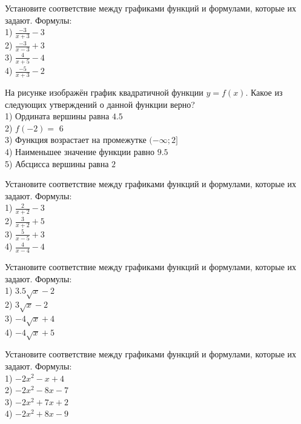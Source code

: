 \documentclass[4apaper]{article}
\begin{document}
\begin{taskBN}{33}
Установите соответствие между графиками функций и формулами, которые их задают. Формулы: \\1) $\frac{-3}{x+3}-3$\\2) $\frac{-3}{x-3}+3$\\3) $\frac{4}{x+5}-4$\\4) $\frac{-5}{x+3}-2$
\end{taskBN}

\begin{taskBN}{34}
На рисунке изображён график квадратичной функции $y=f(x)$. Какое из следующих утверждений о данной функции верно?\\1) Ордината вершины равна $4.5$\\2) $f(-2)=$ $6$\\3) Функция возрастает на промежутке $(-\infty;2]$\\4) Наименьшее значение функции равно  $9.5$\\5) Абсцисса вершины равна $2$
\end{taskBN}

\begin{taskBN}{35}
Установите соответствие между графиками функций и формулами, которые их задают. Формулы: \\1) $\frac{2}{x+2}-3$\\2) $\frac{3}{x+2}+5$\\3) $\frac{5}{x-5}+3$\\4) $\frac{4}{x-4}-4$
\end{taskBN}

\begin{taskBN}{36}
Установите соответствие между графиками функций и формулами, которые их задают. Формулы: \\1) $3.5\sqrt{x}-2$\\2) $3\sqrt{x}-2$\\3) $-4\sqrt{x}+4$\\4) $-4\sqrt{x}+5$
\end{taskBN}

\begin{taskBN}{37}
Установите соответствие между графиками функций и формулами, которые их задают. Формулы: \\1) $-2x^2-x+4$\\2) $-2x^2-8x-7$\\3) $-2x^2+7x+2$\\4) $-2x^2+8x-9$
\end{taskBN}
\end{document}
